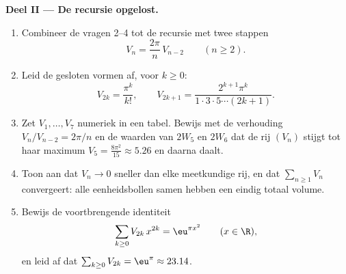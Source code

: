 \begin{problem}[{Weekendopgave --- $V_n =
\pi^{n/2}/\Gamma(\frac n2 + 1)$, en de vreemdheid van hoge
dimensies}]
\medskip
\noindent\textbf{Deel II --- De recursie opgelost.}
\begin{enumerate}[resume]
  \item Combineer de vragen 2--4 tot de recursie met twee stappen
        \[
        V_n = \frac{2\pi}{n}\,V_{n-2}
        \qquad (n \geq 2).
        \]
  \item Leid de gesloten vormen af, voor $k \geq 0$:
        \[
        V_{2k} = \frac{\pi^k}{k!},
        \qquad
        V_{2k+1} = \frac{2^{k+1}\pi^k}{1\cdot3\cdot5\cdots
        (2k+1)} .
        \]
  \item Zet $V_1, \dots, V_7$ numeriek in een tabel. Bewijs met de
        verhouding $V_n/V_{n-2} = 2\pi/n$ en de waarden van $2W_5$
        en $2W_6$ dat de rij $(V_n)$ stijgt tot haar maximum $V_5 =
        \frac{8\pi^2}{15} \approx 5.26$ en daarna daalt.
  \item Toon aan dat $V_n \to 0$ sneller dan elke meetkundige rij,
        en dat $\sum_{n\geq1} V_n$ convergeert: alle eenheidsbollen
        samen hebben een eindig totaal volume.
  \item Bewijs de voortbrengende identiteit
        \[
        \sum_{k\geq0} V_{2k}\,x^{2k} = \eu^{\pi x^2}
        \qquad (x \in \R),
        \]
        en leid af dat $\sum_{k\geq0}V_{2k} = \eu^\pi \approx
        23.14$.
\end{enumerate}


\end{problem}
